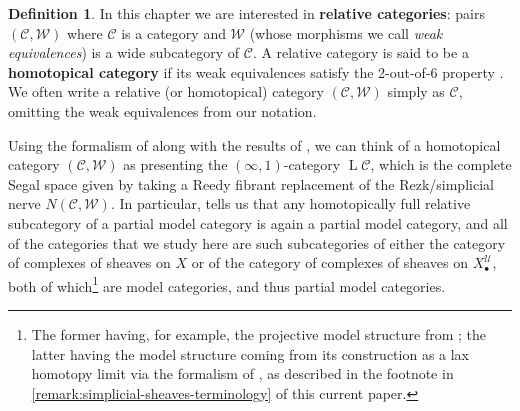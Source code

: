 \documentclass[11pt,fleqn]{article}
\theoremstyle{plain}
\theoremstyle{definition}
\newtheorem{definition}[theorem]{Definition}
\theoremstyle{remark}
\numberwithin{equation}{theorem}
\newcommand{\cover}{\mathcal{U}}
\newcommand{\define}[1]{\textbf{#1}}
\newcommand{\nerve}[1]{X_{#1}^\cover}
\DeclareMathOperator{\LL}{L}
\begin{document}
        \begin{definition}
            In this chapter we are interested in \define{relative categories}: pairs $(\mathcal{C},\mathcal{W})$ where $\mathcal{C}$ is a category and $\mathcal{W}$ (whose morphisms we call \emph{weak equivalences}) is a wide subcategory of $\mathcal{C}$.
            A relative category is said to be a \define{homotopical category} if its weak equivalences satisfy the {2-out-of-6 property} \cite[\S3]{Rie2020}.
            We often write a relative (or homotopical) category $(\mathcal{C},\mathcal{W})$ simply as $\mathcal{C}$, omitting the weak equivalences from our notation.

            Using the formalism of \cite{Rezk2000} along with the results of \cite{Barwick&Kan2013}, we can think of a homotopical category $(\mathcal{C},\mathcal{W})$ as presenting the $(\infty,1)$-category $\LL{\mathcal{C}}$, which is the complete Segal space given by taking a Reedy fibrant replacement of the Rezk/simplicial nerve $N(\mathcal{C},\mathcal{W})$.
            In particular, \cite[§1.2~(ii)]{Barwick&Kan2013} tells us that any homotopically full relative subcategory of a partial model category is again a partial model category, and all of the categories that we study here are such subcategories of either the category of complexes of sheaves on $X$ or of the category of complexes of sheaves on $\nerve{\bullet}$, both of which\footnote{The former having, for example, the projective model structure from \cite{Hovey2001}; the latter having the model structure coming from its construction as a lax homotopy limit via the formalism of \cite{Bergner2012}, as described in the footnote in \cref{remark:simplicial-sheaves-terminology} of this current paper.} are model categories, and thus partial model categories.
        \end{definition}
\end{document}
